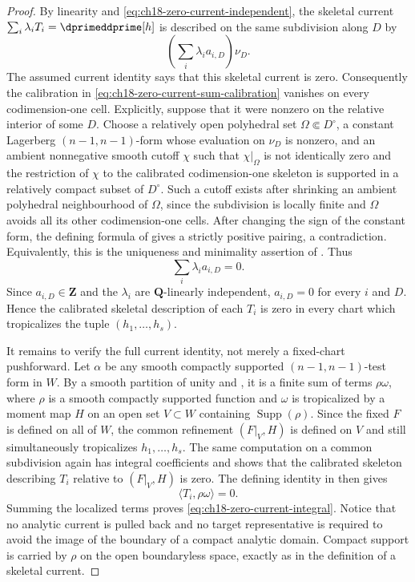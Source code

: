 \begin{proof}
By linearity and \eqref{eq:ch18-zero-current-independent}, the skeletal
current $\sum_i\lambda_iT_i=\dprimeddprime[h]$ is described on the same
subdivision along $D$ by
\begin{equation}
\label{eq:ch18-zero-current-sum-calibration}
                         \left(\sum_i\lambda_i a_{i,D}\right)\nu_D.
\end{equation}
The assumed current identity says that this skeletal current is zero.
Consequently the calibration in
\eqref{eq:ch18-zero-current-sum-calibration} vanishes on every
codimension-one cell.  Explicitly, suppose that it were nonzero on the
relative interior of some $D$.  Choose a relatively open polyhedral set
$\Omega\Subset D^\circ$, a constant Lagerberg $(n-1,n-1)$-form whose
evaluation on $\nu_D$ is nonzero, and an ambient nonnegative smooth cutoff
$\chi$ such that $\chi|_\Omega$ is not identically zero and the restriction
of $\chi$ to the calibrated codimension-one skeleton is supported in a
relatively compact subset of $D^\circ$.  Such a cutoff exists after
shrinking an ambient polyhedral neighbourhood of $\Omega$, since the
subdivision is locally finite and $\Omega$ avoids all its other
codimension-one cells.  After changing the sign of the constant form, the
defining formula of \cite[Definition~7.5.1]{CLD25} gives a strictly positive
pairing, a contradiction.  Equivalently, this is the uniqueness and
minimality assertion of \cite[Propositions~7.5.7--7.5.8]{CLD25}.  Thus
\[
                         \sum_i\lambda_i a_{i,D}=0.
\]
Since $a_{i,D}\in\mathbf Z$ and the $\lambda_i$ are $\mathbf Q$-linearly
independent, $a_{i,D}=0$ for every $i$ and $D$.  Hence the calibrated
skeletal description of each $T_i$ is zero in every chart which
tropicalizes the tuple $(h_1,\ldots,h_s)$.

It remains to verify the full current identity, not merely a fixed-chart
pushforward.  Let $\alpha$ be any smooth compactly supported
$(n-1,n-1)$-test form in $W$.  By a smooth partition of unity and
\cite[Remark~7.2.5]{CLD25}, it is a finite sum of terms $\rho\omega$, where
$\rho$ is a smooth compactly supported function and $\omega$ is tropicalized
by a moment map $H$ on an open set $V\subset W$ containing
$\operatorname{Supp}(\rho)$.  Since the fixed $F$ is defined on all of $W$,
the common refinement $(F|_V,H)$ is defined on $V$ and still simultaneously
tropicalizes $h_1,\ldots,h_s$.  The same computation on a common subdivision
again has integral coefficients and shows that the calibrated skeleton
describing $T_i$ relative to $(F|_V,H)$ is zero.  The
defining identity in \cite[Definition~7.5.1]{CLD25} then gives
\[
                         \langle T_i,\rho\omega\rangle=0.
\]
Summing the localized terms proves \eqref{eq:ch18-zero-current-integral}.
Notice that no analytic current is pulled back and no target representative
is required to avoid the image of the boundary of a compact analytic
domain.  Compact support is carried by $\rho$ on the open boundaryless
space, exactly as in the definition of a skeletal current.


\end{proof}
